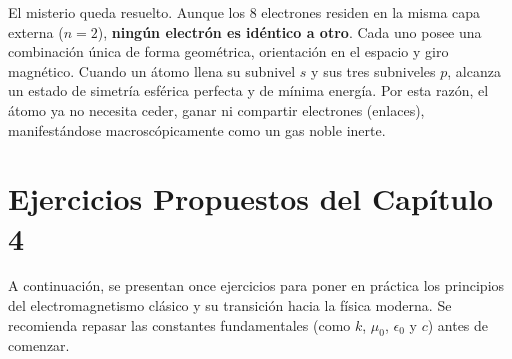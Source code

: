 \documentclass[11pt,a4paper]{book}
\begin{document}
El misterio queda resuelto. Aunque los $8$ electrones residen en la misma capa externa ($n=2$), \textbf{ningún electrón es idéntico a otro}. Cada uno posee una combinación única de forma geométrica, orientación en el espacio y giro magnético. Cuando un átomo llena su subnivel $s$ y sus tres subniveles $p$, alcanza un estado de simetría esférica perfecta y de mínima energía. Por esta razón, el átomo ya no necesita ceder, ganar ni compartir electrones (enlaces), manifestándose macroscópicamente como un gas noble inerte.

\section{Ejercicios Propuestos del Capítulo 4}

A continuación, se presentan once ejercicios para poner en práctica los principios del electromagnetismo clásico y su transición hacia la física moderna. Se recomienda repasar las constantes fundamentales (como $k$, $\mu_0$, $\epsilon_0$ y $c$) antes de comenzar.
\end{document}
